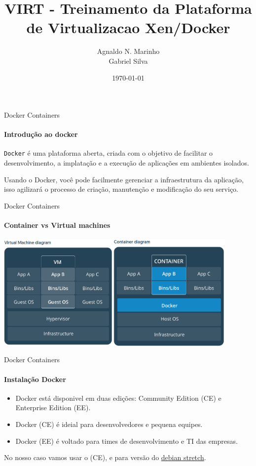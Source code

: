 \documentclass{beamer}
\title{VIRT - Treinamento da Plataforma de Virtualizacao Xen/Docker}
\subtitle{}
\date{\today}
\author{Agnaldo N. Marinho \\ Gabriel Silva}
\institute{\url{http://github.com/agnaldom}}
\begin{document}
\maketitle

\begin{frame}{Docker Containers}
  \framesubtitle{Introdu\c{c}\~ao ao docker}

  \texttt{Docker} \'e uma plataforma aberta, criada com o objetivo de facilitar o desenvolvimento, 
  a implata\c{c}\~ao e a execu\c{c}\~ao de aplica\c{c}\~oes em ambientes isolados. 

  Usando o Docker, voc\^e pode facilmente gerenciar a infraestrutura da aplica\c{c}\~ao, isso agilizar\'a 
  o processo de cria\c{c}\~ao, manuten\c{c}\~ao e modifica\c{c}\~ao do seu servi\c{c}o.
\end{frame}

\begin{frame}{Docker Containers}
    \framesubtitle{Container vs Virtual machines}
    \includegraphics[height=5.7cm]{img/vm.png}\includegraphics[width=6cm]{img/container.png}
\end{frame}

\begin{frame}{Docker Containers}
    \framesubtitle{Instala\c{c}\~ao Docker}
    \begin{itemize}
        \item Docker est\'a disponivel em duas edi\c{c}\~oes: Community Edition (CE) e Enterprise Edition (EE).
        \item Docker (CE) \'e ideial para desenvolvedores e pequena equipes.
        \item Docker (EE) \'e voltado para times de desenvolvimento e TI das empresas.
    \end{itemize}
    No nosso caso vamos usar o (CE), e para vers\~ao do \href{https://docs.docker.com/engine/installation/linux/docker-ce/debian/}{debian stretch}.
\end{frame}
\end{document}

